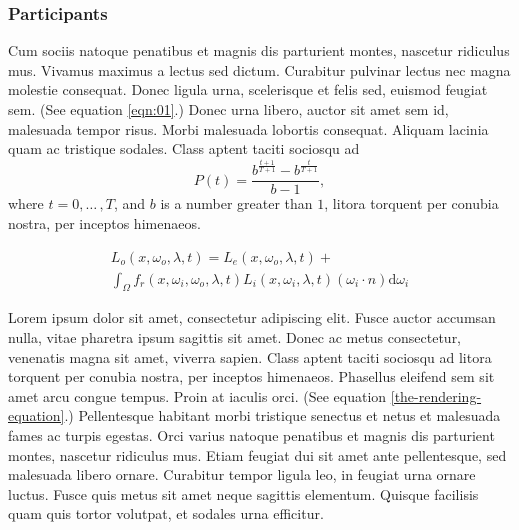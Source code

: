 \subsubsection{Participants}

Cum sociis natoque penatibus et magnis dis parturient montes, nascetur ridiculus mus. Vivamus maximus a lectus sed dictum. Curabitur pulvinar lectus nec magna molestie consequat. Donec ligula urna, scelerisque et felis sed, euismod feugiat sem. (See equation \ref{eqn:01}.) Donec urna libero, auctor sit amet sem id, malesuada tempor risus. Morbi malesuada lobortis consequat. Aliquam lacinia quam ac tristique sodales. Class aptent taciti sociosqu ad 
\begin{equation}
\label{eqn:01}
P(t)=\frac{b^{\frac{t+1}{T+1}}-b^{\frac{t}{T+1}}}{b-1},
\end{equation}
where $t=0,{\ldots}\,,T$, and $b$ is a number greater than $1$, litora torquent per conubia nostra, per inceptos himenaeos.

\begin{multline}
\label{the-rendering-equation}
L_o(x, \omega_o, \lambda, t) = L_e(x, \omega_o, \lambda, t)  + \\
\int_{\Omega} f_r(x, \omega_i, \omega_o, \lambda, t) L_i(x, \omega_i, \lambda, t)(\omega_i \cdot n) \text{d} \omega_i
\end{multline}

Lorem ipsum dolor sit amet, consectetur adipiscing elit. Fusce auctor accumsan nulla, vitae pharetra ipsum sagittis sit amet. Donec ac metus consectetur, venenatis magna sit amet, viverra sapien. Class aptent taciti sociosqu ad litora torquent per conubia nostra, per inceptos himenaeos. Phasellus eleifend sem sit amet arcu congue tempus. Proin at iaculis orci. (See equation \ref{the-rendering-equation}.) Pellentesque habitant morbi tristique senectus et netus et malesuada fames ac turpis egestas. Orci varius natoque penatibus et magnis dis parturient montes, nascetur ridiculus mus. Etiam feugiat dui sit amet ante pellentesque, sed malesuada libero ornare. Curabitur tempor ligula leo, in feugiat urna ornare luctus. Fusce quis metus sit amet neque sagittis elementum. Quisque facilisis quam quis tortor volutpat, et sodales urna efficitur.